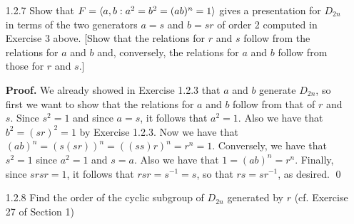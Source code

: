 \begin{enumerate}
      \textbf{Proof.} Suppose that $t = xy$. Since $x^2 = y^2 = 1$, it follows 
      that $x = x^{-1}$ and $y = y^{-1}$, so that
      \begin{align*}
         tx &= (xy)x \\
            &= x(yx) &[\text{Associativity}] \\
            &= x(y^{-1}x^{-1}) \\
            &= x(xy)^{-1} \\
            &= xt^{-1},
      \end{align*}
      as desired. \qed
   \item[1.2.7]   Show that $F = \langle a, b : a^2 = b^2 = (ab)^n = 1 \rangle$ gives a
                  presentation for $D_{2n}$ in terms of the two generators
                  $a = s$ and $b = sr$ of order 2 computed in Exercise 3 above.
                  [Show that the relations for $r$ and $s$ follow from the
                  relations for $a$ and $b$ and, conversely, the relations for
                  $a$ and $b$ follow from those for $r$ and $s$.]
                  
      \textbf{Proof.} We already showed in Exercise 1.2.3 that $a$ and $b$
      generate $D_{2n}$, so first we want to show that the relations for $a$ and
      $b$ follow from that of $r$ and $s$. Since $s^2 = 1$ and since $a = s$, it
      follows that $a^2 = 1$. Also we have that $b^2 = (sr)^2 = 1$ by Exercise
      1.2.3. Now we have that $(ab)^n = (s(sr))^n = ((ss)r)^n = r^n = 1$.
      Conversely, we have that $s^2 = 1$ since $a^2 = 1$ and $s = a$. Also we
      have that $1 = (ab)^n = r^n$. Finally, since $srsr = 1$, it follows that
      $rsr = s^{-1} = s$, so that $rs = sr^{-1}$, as desired. \qed
   \item[1.2.8]   Find the order of the cyclic subgroup of $D_{2n}$ generated by
                  $r$ (cf. Exercise 27 of Section 1)
                  

\end{enumerate}

